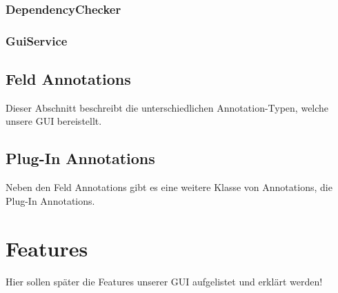 \documentclass[a4paper, 11pt]{article} %
\begin{document}

\subsubsection{DependencyChecker}
\label{sssub:dependencychecker}


\subsubsection{GuiService}
\label{sssub:guiservice}



\subsection{Feld Annotations} %
\label{sub:annotations}
Dieser Abschnitt beschreibt die unterschiedlichen Annotation-Typen, welche unsere GUI bereistellt.


\subsection{Plug-In Annotations} %
\label{sub:subsection_name}
Neben den Feld Annotations gibt es eine weitere Klasse von Annotations, die Plug-In Annotations. 

\section{Features} %
\label{sec:features}
Hier sollen später die Features unserer GUI aufgelistet und erklärt werden!





\end{document}
